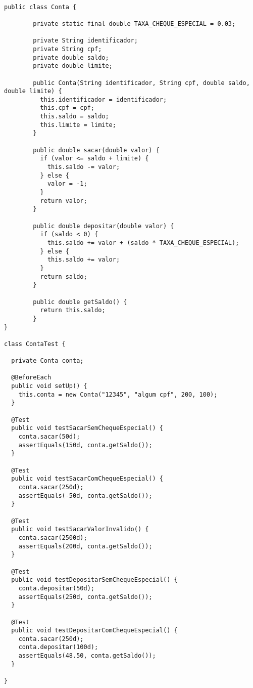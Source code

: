 \documentclass{lib/eng_softdoc}
\begin{document}
\answer 
\\
\begin{lstlisting}
public class Conta {

        private static final double TAXA_CHEQUE_ESPECIAL = 0.03;

        private String identificador;
        private String cpf;
        private double saldo;
        private double limite;

        public Conta(String identificador, String cpf, double saldo, double limite) {
          this.identificador = identificador;
          this.cpf = cpf;
          this.saldo = saldo;
          this.limite = limite;
        }

        public double sacar(double valor) {
          if (valor <= saldo + limite) {
            this.saldo -= valor;
          } else {
            valor = -1;
          }
          return valor;
        }

        public double depositar(double valor) {
          if (saldo < 0) {
            this.saldo += valor + (saldo * TAXA_CHEQUE_ESPECIAL);
          } else {
            this.saldo += valor;
          }
          return saldo;
        }

        public double getSaldo() {
          return this.saldo;
        }
}

class ContaTest {

  private Conta conta;

  @BeforeEach
  public void setUp() {
    this.conta = new Conta("12345", "algum cpf", 200, 100);
  }

  @Test
  public void testSacarSemChequeEspecial() {
    conta.sacar(50d);
    assertEquals(150d, conta.getSaldo());
  }

  @Test
  public void testSacarComChequeEspecial() {
    conta.sacar(250d);
    assertEquals(-50d, conta.getSaldo());
  }

  @Test
  public void testSacarValorInvalido() {
    conta.sacar(2500d);
    assertEquals(200d, conta.getSaldo());
  }

  @Test
  public void testDepositarSemChequeEspecial() {
    conta.depositar(50d);
    assertEquals(250d, conta.getSaldo());
  }

  @Test
  public void testDepositarComChequeEspecial() {
    conta.sacar(250d);
    conta.depositar(100d);
    assertEquals(48.50, conta.getSaldo());
  }

}
\end{lstlisting}
\end{document}
